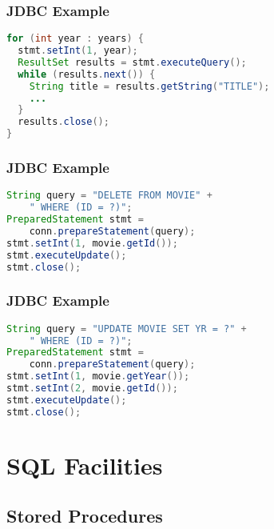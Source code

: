 \documentclass[dvipsnames]{beamer}
\theoremstyle{plain}
\begin{document}
\begin{frame}[fragile]
  \frametitle{JDBC Example}

  \begin{example}
    \begin{lstlisting}[language=Java]
for (int year : years) {
  stmt.setInt(1, year);
  ResultSet results = stmt.executeQuery();
  while (results.next()) {
    String title = results.getString("TITLE");
    ...
  }
  results.close();
}
    \end{lstlisting}
  \end{example}
\end{frame}

\begin{frame}[fragile]
  \frametitle{JDBC Example}

  \begin{example}[deleting]
    \begin{lstlisting}[language=Java]
String query = "DELETE FROM MOVIE" +
    " WHERE (ID = ?)";
PreparedStatement stmt =
    conn.prepareStatement(query);
stmt.setInt(1, movie.getId());
stmt.executeUpdate();
stmt.close();
    \end{lstlisting}
  \end{example}
\end{frame}

\begin{frame}[fragile]
  \frametitle{JDBC Example}

  \begin{example}[updating]
    \begin{lstlisting}[language=Java]
String query = "UPDATE MOVIE SET YR = ?" +
    " WHERE (ID = ?)";
PreparedStatement stmt =
    conn.prepareStatement(query);
stmt.setInt(1, movie.getYear());
stmt.setInt(2, movie.getId());
stmt.executeUpdate();
stmt.close();
    \end{lstlisting}
  \end{example}
\end{frame}

\section{SQL Facilities}

\subsection{Stored Procedures}
\end{document}
